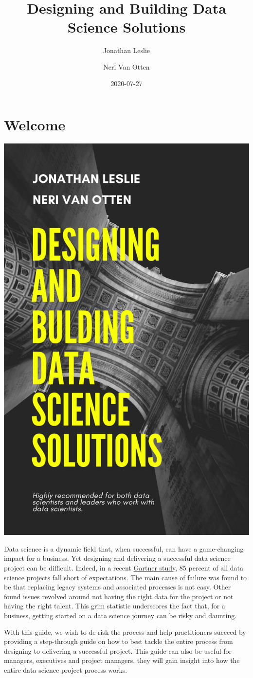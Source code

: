 \documentclass[]{book}
\title{Designing and Building Data Science Solutions}
\author{Jonathan Leslie \and Neri Van Otten}
\date{2020-07-27}
\begin{document}
\maketitle

\hypertarget{welcome}{%
\chapter*{Welcome}\label{welcome}}

\includegraphics[width=0.5\linewidth]{figures/Designing and bulding data science solutions}

Data science is a dynamic field that, when successful, can have a
game-changing impact for a business. Yet designing and delivering a
successful data science project can be difficult. Indeed, in a recent
\href{https://www.gartner.com/en/newsroom/press-releases/2018-02-13-gartner-says-nearly-half-of-cios-are-planning-to-deploy-artificial-intelligence}{Gartner
study}, 85 percent of all data science projects fall short of
expectations. The main cause of failure was found to be that replacing
legacy systems and associated processes is not easy. Other found issues
revolved around not having the right data for the project or not having
the right talent. This grim statistic underscores the fact that, for a
business, getting started on a data science journey can be risky and
daunting.

With this guide, we wish to de-risk the process and help practitioners
succeed by providing a step-through guide on how to best tackle the
entire process from designing to delivering a successful project. This
guide can also be useful for managers, executives and project managers,
they will gain insight into how the entire data science project process
works.
\end{document}
